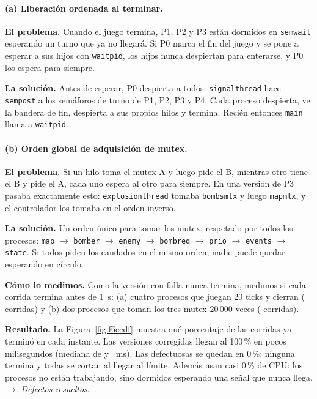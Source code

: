 \documentclass[11pt,a4paper]{article}
\newcommand{\cod}[1]{\texttt{#1}}
\renewcommand{\_}{\textunderscore\allowbreak}
\begin{document}
\paragraph{(a) Liberación ordenada al terminar.}

\textbf{El problema.} Cuando el juego termina, P1, P2 y P3 están dormidos en \cod{sem\_wait} esperando un turno que ya no llegará. Si P0 marca el fin del juego y se pone a esperar a sus hijos con \cod{waitpid}, los hijos nunca despiertan para enterarse, y P0 los espera para siempre.

\textbf{La solución.} Antes de esperar, P0 despierta a todos: \cod{signal\_thread} hace \cod{sem\_post} a los semáforos de turno de P1, P2, P3 y P4. Cada proceso despierta, ve la bandera de fin, despierta a sus propios hilos y termina. Recién entonces \cod{main} llama a \cod{waitpid}.

\paragraph{(b) Orden global de adquisición de mutex.}

\textbf{El problema.} Si un hilo toma el mutex A y luego pide el B, mientras otro tiene el B y pide el A, cada uno espera al otro para siempre. En una versión de P3 pasaba exactamente esto: \cod{explosion\_thread} tomaba \cod{bombs\_mtx} y luego \cod{map\_mtx}, y el controlador los tomaba en el orden inverso.

\textbf{La solución.} Un orden único para tomar los mutex, respetado por todos los procesos: \cod{map} $\to$ \cod{bomber} $\to$ \cod{enemy} $\to$ \cod{bomb\_req} $\to$ \cod{prio} $\to$ \cod{events} $\to$ \cod{state}. Si todos piden los candados en el mismo orden, nadie puede quedar esperando en círculo.

\textbf{Cómo lo medimos.} Como la versión con falla nunca termina, medimos si cada corrida termina antes de 1~s: (a) cuatro procesos que juegan 20 ticks y cierran (\NseisAN{} corridas) y (b) dos procesos que toman los tres mutex 20\,000 veces (\NseisBN{} corridas).

\textbf{Resultado.} La Figura~\ref{fig:f6ecdf} muestra qué porcentaje de las corridas ya terminó en cada instante. Las versiones corregidas llegan al 100\,\% en pocos milisegundos (mediana de \NseisAOkMs{} y \NseisBOkMs~ms). Las defectuosas se quedan en 0\,\%: ninguna termina y todas se cortan al llegar al límite. Además usan casi 0\,\% de CPU: los procesos no están trabajando, sino dormidos esperando una señal que nunca llega. $\to$ \emph{Defectos resueltos}.
\end{document}
